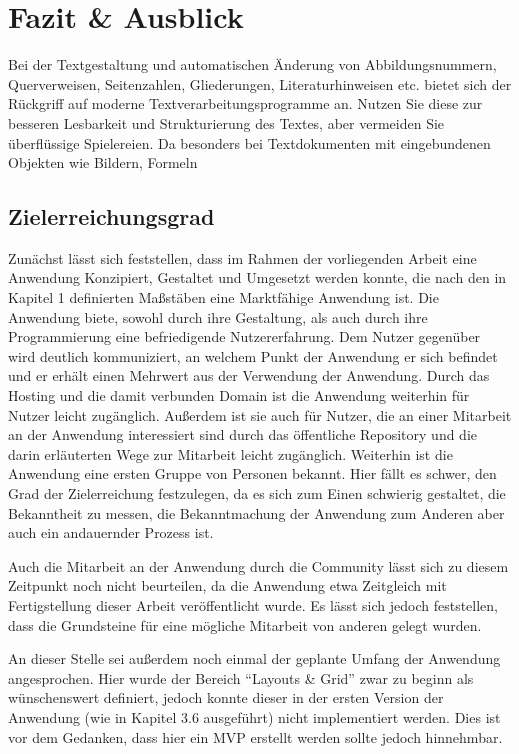\chapter{Fazit \& Ausblick}
\thispagestyle{fancy}

Bei der Textgestaltung und automatischen Änderung von Abbildungsnummern, Querverweisen,
Seitenzahlen, Gliederungen, Literaturhinweisen etc. bietet sich der Rückgriff
auf moderne Textverarbeitungsprogramme an. Nutzen Sie diese zur besseren Lesbarkeit
und Strukturierung des Textes, aber vermeiden Sie überflüssige Spielereien. Da
besonders bei Textdokumenten mit eingebundenen Objekten wie Bildern, Formeln

\section{Zielerreichungsgrad}
Zunächst lässt sich feststellen, dass im Rahmen der vorliegenden Arbeit eine Anwendung Konzipiert, Gestaltet und Umgesetzt werden konnte, die nach den in Kapitel 1 definierten Maßstäben eine Marktfähige Anwendung ist.
Die Anwendung biete, sowohl durch ihre Gestaltung, als auch durch ihre Programmierung eine befriedigende Nutzererfahrung. Dem Nutzer gegenüber wird deutlich kommuniziert, an welchem Punkt der Anwendung er sich befindet und er erhält einen Mehrwert aus der Verwendung der Anwendung.
Durch das Hosting und die damit verbunden Domain ist die Anwendung weiterhin für Nutzer leicht zugänglich. Außerdem ist sie auch für Nutzer, die an einer Mitarbeit an der Anwendung interessiert sind durch das öffentliche Repository und die darin erläuterten Wege zur Mitarbeit leicht zugänglich.
Weiterhin ist die Anwendung eine ersten Gruppe von Personen bekannt. Hier fällt es schwer, den Grad der Zielerreichung festzulegen, da es sich zum Einen schwierig gestaltet, die Bekanntheit zu messen, die Bekanntmachung der Anwendung zum Anderen aber auch ein andauernder Prozess ist.

Auch die Mitarbeit an der Anwendung durch die Community lässt sich zu diesem Zeitpunkt noch nicht beurteilen, da die Anwendung etwa Zeitgleich mit Fertigstellung dieser Arbeit veröffentlicht wurde. Es lässt sich jedoch feststellen, dass die Grundsteine für eine mögliche Mitarbeit von anderen gelegt wurden.

An dieser Stelle sei außerdem noch einmal der geplante Umfang der Anwendung angesprochen. Hier wurde der Bereich “Layouts \& Grid” zwar zu beginn als wünschenswert definiert, jedoch konnte dieser in der ersten Version der Anwendung (wie in Kapitel 3.6 ausgeführt) nicht implementiert werden. Dies ist vor dem Gedanken, dass hier ein MVP erstellt werden sollte jedoch hinnehmbar.

